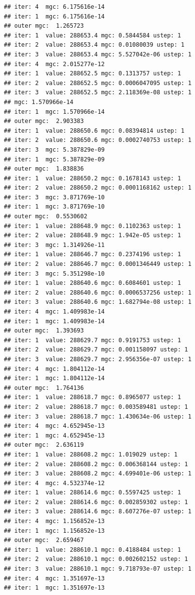 \documentclass{article}\usepackage[]{graphicx}\usepackage[]{xcolor}
\makeatletter
\newenvironment{kframe}{%
 \def\at@end@of@kframe{}%
 \ifinner\ifhmode%
  \def\at@end@of@kframe{\end{minipage}}%
  \begin{minipage}{\columnwidth}%
 \fi\fi%
 \def\FrameCommand##1{\hskip\@totalleftmargin \hskip-\fboxsep
 \colorbox{shadecolor}{##1}\hskip-\fboxsep
     \hskip-\linewidth \hskip-\@totalleftmargin \hskip\columnwidth}%
 \MakeFramed {\advance\hsize-\width
   \@totalleftmargin\z@ \linewidth\hsize
   \@setminipage}}%
 {\par\unskip\endMakeFramed%
 \at@end@of@kframe}
\newenvironment{knitrout}{}{} %
\makeatother
\begin{document}
\begin{knitrout}
\begin{kframe}
\begin{verbatim}
## iter: 4  mgc: 6.175616e-14 
## iter: 1  mgc: 6.175616e-14 
## outer mgc:  1.265723 
## iter: 1  value: 288653.4 mgc: 0.5844584 ustep: 1 
## iter: 2  value: 288653.4 mgc: 0.01080039 ustep: 1 
## iter: 3  value: 288653.4 mgc: 5.527042e-06 ustep: 1 
## iter: 4  mgc: 2.015277e-12 
## iter: 1  value: 288652.5 mgc: 0.1313757 ustep: 1 
## iter: 2  value: 288652.5 mgc: 0.0006047095 ustep: 1 
## iter: 3  value: 288652.5 mgc: 2.118369e-08 ustep: 1 
## mgc: 1.570966e-14 
## iter: 1  mgc: 1.570966e-14 
## outer mgc:  2.903383 
## iter: 1  value: 288650.6 mgc: 0.08394814 ustep: 1 
## iter: 2  value: 288650.6 mgc: 0.0002740753 ustep: 1 
## iter: 3  mgc: 5.387829e-09 
## iter: 1  mgc: 5.387829e-09 
## outer mgc:  1.838836 
## iter: 1  value: 288650.2 mgc: 0.1678143 ustep: 1 
## iter: 2  value: 288650.2 mgc: 0.0001168162 ustep: 1 
## iter: 3  mgc: 3.871769e-10 
## iter: 1  mgc: 3.871769e-10 
## outer mgc:  0.5530602 
## iter: 1  value: 288648.9 mgc: 0.1102363 ustep: 1 
## iter: 2  value: 288648.9 mgc: 1.942e-05 ustep: 1 
## iter: 3  mgc: 1.314926e-11 
## iter: 1  value: 288646.7 mgc: 0.2374196 ustep: 1 
## iter: 2  value: 288646.7 mgc: 0.0001346449 ustep: 1 
## iter: 3  mgc: 5.351298e-10 
## iter: 1  value: 288640.6 mgc: 0.6084601 ustep: 1 
## iter: 2  value: 288640.6 mgc: 0.0006537256 ustep: 1 
## iter: 3  value: 288640.6 mgc: 1.682794e-08 ustep: 1 
## iter: 4  mgc: 1.409983e-14 
## iter: 1  mgc: 1.409983e-14 
## outer mgc:  1.393693 
## iter: 1  value: 288629.7 mgc: 0.9191753 ustep: 1 
## iter: 2  value: 288629.7 mgc: 0.001158097 ustep: 1 
## iter: 3  value: 288629.7 mgc: 2.956356e-07 ustep: 1 
## iter: 4  mgc: 1.804112e-14 
## iter: 1  mgc: 1.804112e-14 
## outer mgc:  1.764136 
## iter: 1  value: 288618.7 mgc: 0.8965077 ustep: 1 
## iter: 2  value: 288618.7 mgc: 0.003589481 ustep: 1 
## iter: 3  value: 288618.7 mgc: 1.430634e-06 ustep: 1 
## iter: 4  mgc: 4.652945e-13 
## iter: 1  mgc: 4.652945e-13 
## outer mgc:  2.636119 
## iter: 1  value: 288608.2 mgc: 1.019029 ustep: 1 
## iter: 2  value: 288608.2 mgc: 0.006368144 ustep: 1 
## iter: 3  value: 288608.2 mgc: 4.699401e-06 ustep: 1 
## iter: 4  mgc: 4.532374e-12 
## iter: 1  value: 288614.6 mgc: 0.5597425 ustep: 1 
## iter: 2  value: 288614.6 mgc: 0.002859302 ustep: 1 
## iter: 3  value: 288614.6 mgc: 8.607276e-07 ustep: 1 
## iter: 4  mgc: 1.156852e-13 
## iter: 1  mgc: 1.156852e-13 
## outer mgc:  2.659467 
## iter: 1  value: 288610.1 mgc: 0.4188484 ustep: 1 
## iter: 2  value: 288610.1 mgc: 0.002602152 ustep: 1 
## iter: 3  value: 288610.1 mgc: 9.718793e-07 ustep: 1 
## iter: 4  mgc: 1.351697e-13 
## iter: 1  mgc: 1.351697e-13 

\end{verbatim}
\end{kframe}
\end{knitrout}
\end{document}
